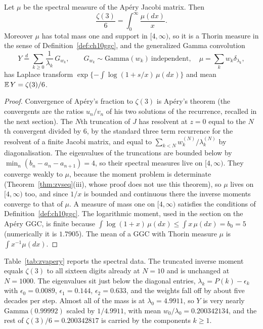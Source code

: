 \begin{theorem}\label{thm:zvapery}
Let $\mu$ be the spectral measure of the Ap\'ery Jacobi matrix. Then
\[
\frac{\zeta(3)}{6}=\int_0^\infty\frac{\mu(dx)}{x}.
\]
Moreover $\mu$ has total mass one and support in $[4,\infty)$, so it is a Thorin measure in the sense of Definition~\ref{def:ch10ggc}, and the generalized Gamma convolution
\[
Y\overset{d}{=}\sum_{k\ge0}\frac{1}{\lambda_k}\,G_{w_k},\qquad G_{w_k}\sim\mathrm{Gamma}(w_k)\ \text{independent},\quad \mu=\sum_k w_k\delta_{\lambda_k},
\]
has Laplace transform $\exp\{-\int\log(1+s/x)\,\mu(dx)\}$ and mean $\mathbb{E}\,Y=\zeta(3)/6$.
\end{theorem}

\begin{proof}
Convergence of Ap\'ery's fraction to $\zeta(3)$ is Ap\'ery's theorem (the convergents are the ratios $u_n/v_n$ of his two solutions of the recurrence, recalled in the next section). The $N$th truncation of $J$ has resolvent at $z=0$ equal to the $N$th convergent divided by $6$, by the standard three term recurrence for the resolvent of a finite Jacobi matrix, and equal to $\sum_{k<N}w_k^{(N)}/\lambda_k^{(N)}$ by diagonalisation. The eigenvalues of the truncations are bounded below by $\min_n(b_n-a_n-a_{n+1})=4$, so their spectral measures live on $[4,\infty)$. They converge weakly to $\mu$, because the moment problem is determinate (Theorem~\ref{thm:zvseq}(iii), whose proof does not use this theorem), so $\mu$ lives on $[4,\infty)$ too, and since $1/x$ is bounded and continuous there the inverse moments converge to that of $\mu$. A measure of mass one on $[4,\infty)$ satisfies the conditions of Definition~\ref{def:ch10ggc}. The logarithmic moment, used in the section on the Ap\'ery GGC, is finite because $\int\log(1+x)\,\mu(dx)\le\int x\,\mu(dx)=b_0=5$ (numerically it is $1.7905$). The mean of a GGC with Thorin measure $\mu$ is $\int x^{-1}\mu(dx)$.
\end{proof}

Table~\ref{tab:zvapery} reports the spectral data. The truncated inverse moment equals $\zeta(3)$ to all sixteen digits already at $N=10$ and is unchanged at $N=1000$. The eigenvalues sit just below the diagonal entries, $\lambda_k=P(k)-\epsilon_k$ with $\epsilon_0=0.0089$, $\epsilon_1=0.144$, $\epsilon_2=0.633$, and the weights fall off by about five decades per step. Almost all of the mass is at $\lambda_0=4.9911$, so $Y$ is very nearly $\mathrm{Gamma}(0.99992)$ scaled by $1/4.9911$, with mean $w_0/\lambda_0=0.200342134$, and the rest of $\zeta(3)/6=0.200342817$ is carried by the components $k\ge1$.


